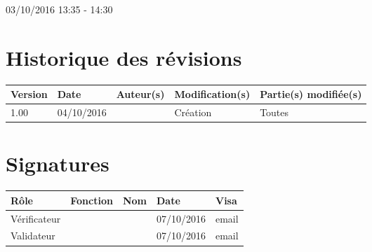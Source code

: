 \documentclass [a4paper] {article}
\begin{document}
03/10/2016			 				%
\hfill   
\hfill 	 13:35 - 14:30				%


\section*{Historique des révisions}
\begin{center}
			\begin{tabular}{| p{2.5cm} | p{3cm} | p{3cm} | p{3cm} | p{3.5cm} |}
				\hline
				\rowcolor{Gray}
				Version & Date & Auteur(s) & Modification(s) & Partie(s) modifiée(s)		 \\
				\hline
				1.00 & 04/10/2016 & \Kafui & Création & Toutes \\
				\hline			
			\end{tabular}
		\end{center}

\section*{Signatures}

		\begin{center}
			\begin{tabular}{| p{2.5cm} | p{4cm} | p{3cm} | p{3cm} | p{2.5cm} |}
				\hline
				\rowcolor{Gray}
				Rôle & Fonction & Nom & Date & Visa		 \\
				\hline
				Vérificateur & \RGC & \Melissa & 07/10/2016 & email \\[30pt]
				\hline
				Validateur & \CP & \Pierre &  07/10/2016 & email \\[30pt]	
				\hline
			\end{tabular}
		\end{center}

\end{document}
